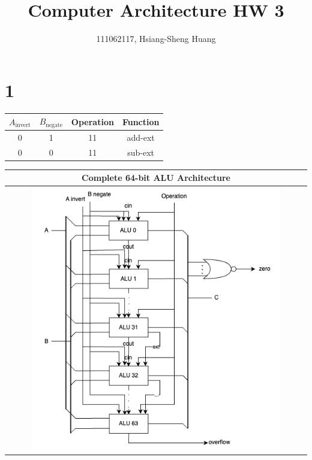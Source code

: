 \documentclass[12pt]{article}
\title{Computer Architecture HW 3}
\author{111062117, Hsiang-Sheng Huang}
\begin{document}
\maketitle

\section*{1}
\begin{center}
\begin{tabular}{|c|c|c|c|}
\hline
\textbf{$A_{\text{invert}}$} & \textbf{$B_{\text{negate}}$} & \textbf{Operation} & \textbf{Function} \\
\hline
0 & 1 & 11 & add-ext\\
\hline
0 & 0 & 11 & sub-ext \\
\hline
\end{tabular}
\end{center}

\begin{center}
\begin{table}[h]
\centering
\begin{tabular}{|c|}
\hline
\textbf{Complete 64-bit ALU Architecture} \\
\hline
\includegraphics[width=0.84\textwidth]{./img/q1_ALU.png} \\
\hline
\end{tabular}
\end{table}
\end{center}
\end{document}
